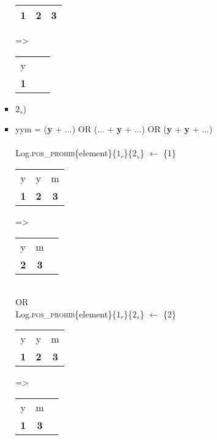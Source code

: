 \documentclass{article}
\begin{document}
\begin{itemize}
\begin{itemize}
\begin{enumerate}
\begin{itemize}
\begin{tabular}{ |c|c|c| }
                 \textbf{1} & \textbf{2} & \textbf{3} \\ 
                 \hline
                \end{tabular}
                =\textgreater~
                \begin{tabular}{ |c|c|c| } 
                 \hline
                 y \\ 
                 \textbf{1} \\ 
                 \hline
                \end{tabular}
                \item $2_s$)
                \item yym = (\textbf{y} + ...) OR (... + \textbf{y} + ...) OR (\textbf{y} + \textbf{y} + ...)
                \\ \\
                Log.\textsc{pos\_prohib}\{element\}\{\textsc{$1_r$}\}\{\textsc{$2_s$}\} $\leftarrow$ \{1\}
                \\
                \begin{tabular}{ |c|c|c| } 
                 \hline
                 y & y & m \\ 
                 \textbf{1} & \textbf{2} & \textbf{3} \\ 
                 \hline
                \end{tabular}
                =\textgreater~
               \begin{tabular}{ |c|c|c| } 
                 \hline
                 y & m \\ 
                 \textbf{2} & \textbf{3} \\ 
                 \hline
                \end{tabular} \\
                
                OR \\
                Log.\textsc{pos\_prohib}\{element\}\{\textsc{$1_r$}\}\{\textsc{$2_s$}\} $\leftarrow$ \{2\}
                \\
                
                \begin{tabular}{ |c|c|c| } 
                 \hline
                 y & y & m \\ 
                 \textbf{1} & \textbf{2} & \textbf{3} \\ 
                 \hline
                \end{tabular}
                =\textgreater~
               \begin{tabular}{ |c|c|c| } 
                 \hline
                 y & m \\ 
                 \textbf{1} & \textbf{3} \\ 
                 \hline
                \end{tabular} \\
                

\end{itemize}
\end{enumerate}
\end{itemize}
\end{itemize}
\end{document}
